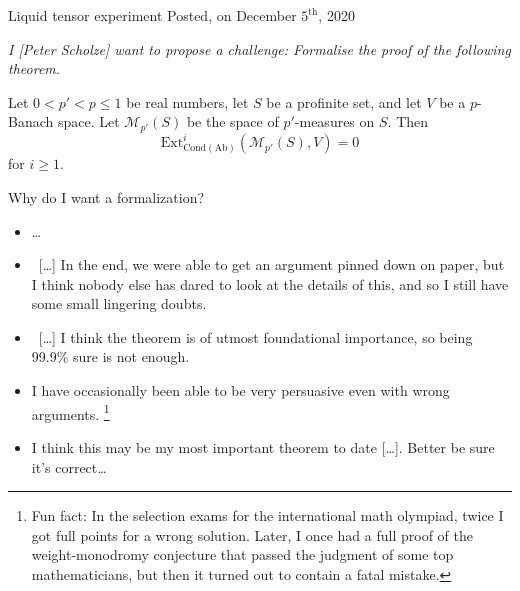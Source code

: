 \documentclass[10pt]{beamer}
\begin{document}
\begin{frame}
{\Large Liquid tensor experiment}
Posted, on December $5^\text{th}$, 2020
\vspace{.5cm}

{\it
I {\rm \textcolor{arancio}{[Peter Scholze]}} want to propose a challenge: Formalise the proof of the following theorem.

\begin{theorem}[Clausen--S.] Let $0<p'<p\leq 1$ be real numbers, let $S$ be a profinite set, and let $V$ be a $p$-Banach space. Let $\mathcal M_{p'}(S)$ be the space of $p'$-measures on $S$. Then
\[
\mathrm{Ext}^i_{\mathrm{Cond}(\mathrm{Ab})}(\mathcal M_{p'}(S),V)=0
\]
for $i\geq 1$.
\end{theorem}}
\pause
{}
{\vspace{.75cm}
Why do I want a formalization?}
\pause
{}
{\begin{itemize}
\it
\item \dots
\item ~[\dots] In the end, we were able to get an argument pinned down on paper, but I think nobody else has dared to look at the details of this, and so I still have some small lingering doubts.
\item ~[\dots] I think the theorem is of utmost foundational importance, so being 99.9\% sure is not enough.
\item I have occasionally been able to be very persuasive even with wrong arguments. \footnote{Fun fact: In the selection exams for the international math olympiad, twice I got full points for a wrong solution. Later, I once had a full proof of the weight-monodromy conjecture that passed the judgment of some top mathematicians, but then it turned out to contain a fatal mistake.}
\item I think this may be my most important theorem to date [\dots]. Better be sure it’s correct\dots
\end{itemize}}
\end{frame}
\end{document}
